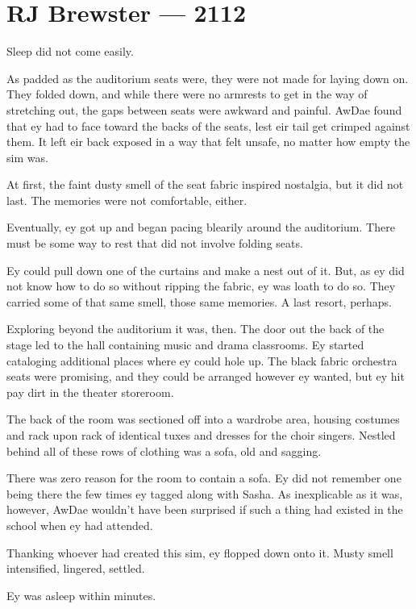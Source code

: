 \hypertarget{rj-brewster-2112}{%
\chapter*{RJ Brewster — 2112}\label{rj-brewster-2112}}

Sleep did not come easily.

As padded as the auditorium seats were, they were not made for laying down on. They folded down, and while there were no armrests to get in the way of stretching out, the gaps between seats were awkward and painful. AwDae found that ey had to face toward the backs of the seats, lest eir tail get crimped against them. It left eir back exposed in a way that felt unsafe, no matter how empty the sim was.

At first, the faint dusty smell of the seat fabric inspired nostalgia, but it did not last. The memories were not comfortable, either.

Eventually, ey got up and began pacing blearily around the auditorium. There must be some way to rest that did not involve folding seats.

Ey could pull down one of the curtains and make a nest out of it. But, as ey did not know how to do so without ripping the fabric, ey was loath to do so. They carried some of that same smell, those same memories. A last resort, perhaps.

Exploring beyond the auditorium it was, then. The door out the back of the stage led to the hall containing music and drama classrooms. Ey started cataloging additional places where ey could hole up. The black fabric orchestra seats were promising, and they could be arranged however ey wanted, but ey hit pay dirt in the theater storeroom.

The back of the room was sectioned off into a wardrobe area, housing costumes and rack upon rack of identical tuxes and dresses for the choir singers. Nestled behind all of these rows of clothing was a sofa, old and sagging.

There was zero reason for the room to contain a sofa. Ey did not remember one being there the few times ey tagged along with Sasha. As inexplicable as it was, however, AwDae wouldn't have been surprised if such a thing had existed in the school when ey had attended.

Thanking whoever had created this sim, ey flopped down onto it. Musty smell intensified, lingered, settled.

Ey was asleep within minutes.

